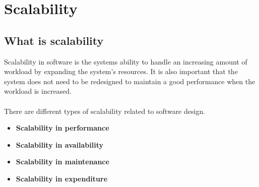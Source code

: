 \section{Scalability}



\subsection{What is scalability}
Scalability in software is the systems ability to handle an increasing amount of workload by expanding the system's resources. It is also important that the system does not need to be redesigned to maintain a good performance when the workload is increased.
\\\\
There are different types of scalability related to software design.
\begin{itemize}
    \item \textbf{Scalability in performance} 
    \item \textbf{Scalability in availability}
    \item \textbf{Scalability in maintenance}
    \item \textbf{Scalability in expenditure}
\end{itemize}

% 